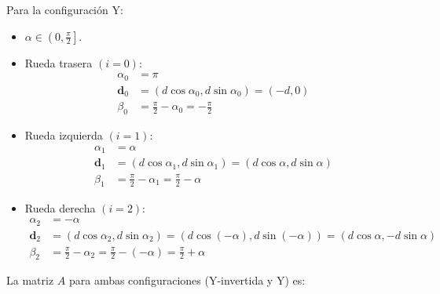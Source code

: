 \documentclass[11pt,a4paper]{article}
\newcommand{\vect}[1]{\bm{#1}}       %
\begin{document}
Para la configuración Y:

\begin{itemize}
    \item \(\alpha \in \left(0, \frac{\pi}{2}\right]\).
    \item Rueda trasera \((i = 0)\):
          \[
              \begin{aligned}
                  \alpha_0   & = \pi                                       \\
                  \vect{d}_0 & = (d\cos\alpha_0, d\sin\alpha_0) = (-d, 0)  \\
                  \beta_0    & = \frac{\pi}{2} - \alpha_0 = -\frac{\pi}{2}
              \end{aligned}
          \]
    \item Rueda izquierda \((i = 1)\):
          \[
              \begin{aligned}
                  \alpha_1   & = \alpha                                                      \\
                  \vect{d}_1 & = (d\cos\alpha_1, d\sin\alpha_1) = (d\cos\alpha, d\sin\alpha) \\
                  \beta_1    & = \frac{\pi}{2} - \alpha_1 = \frac{\pi}{2} - \alpha
              \end{aligned}
          \]
    \item Rueda derecha \((i = 2)\):
          \[
              \begin{aligned}
                  \alpha_2   & = -\alpha                                                                                         \\
                  \vect{d}_2 & = (d\cos\alpha_2, d\sin\alpha_2) = (d\cos(-\alpha), d\sin(-\alpha)) = (d\cos\alpha, -d\sin\alpha) \\
                  \beta_2    & = \frac{\pi}{2} - \alpha_2 = \frac{\pi}{2} - (-\alpha) = \frac{\pi}{2} + \alpha
              \end{aligned}
          \]
\end{itemize}

La matriz \(A\) para ambas configuraciones (Y-invertida y Y) es:
\end{document}
